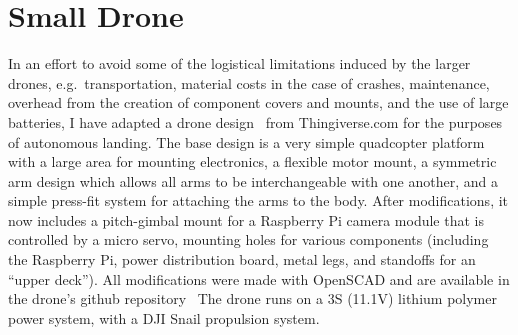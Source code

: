 \section{Small Drone}
\label{section:small_drone}

In an effort to avoid some of the logistical limitations induced by the larger drones,
e.g.~transportation, material costs in the case of crashes, maintenance, overhead from the creation of
component covers and mounts, and the use of large batteries,
I have adapted a drone design~\cite{raspberry_pi_drone_thingiverse_original} from Thingiverse.com for the purposes of autonomous landing.
The base design is a very simple quadcopter platform with
a large area for mounting electronics,
a flexible motor mount,
a symmetric arm design which allows all arms to be interchangeable with one another,
and
a simple press-fit system for attaching the arms to the body.
After modifications, it now includes a pitch-gimbal mount for a Raspberry Pi camera module that is controlled by a micro servo,
mounting holes for various components (including the Raspberry Pi, power distribution board, metal legs, and standoffs for an ``upper deck'').
All modifications were made with OpenSCAD and are available in the drone's github repository~
The drone runs on a 3S (11.1V) lithium polymer power system, with a DJI Snail propulsion system.

